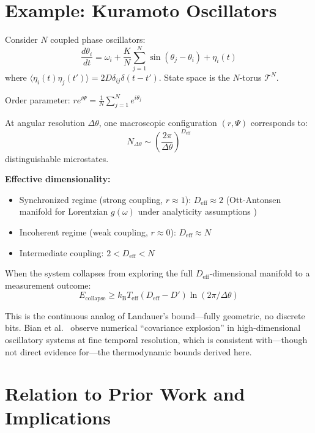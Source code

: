 \documentclass[12pt]{article}
\numberwithin{equation}{section}
\newcommand{\kB}{k_{\mathrm{B}}}
\newcommand{\Teff}{T_{\mathrm{eff}}}
\begin{document}
\section{Example: Kuramoto Oscillators}

Consider $N$ coupled phase oscillators:
\begin{equation}
\frac{d\theta_i}{dt} = \omega_i + \frac{K}{N}\sum_{j=1}^N \sin(\theta_j - \theta_i) + \eta_i(t)
\end{equation}
where $\langle\eta_i(t)\eta_j(t')\rangle = 2D\delta_{ij}\delta(t-t')$. State space is the $N$-torus $\mathcal{T}^N$.

Order parameter: $r e^{i\Psi} = \frac{1}{N}\sum_{j=1}^N e^{i\theta_j}$

At angular resolution $\Delta\theta$, one macroscopic configuration $(r, \Psi)$ corresponds to:
\begin{equation}
N_{\Delta\theta} \sim \left(\frac{2\pi}{\Delta\theta}\right)^{D_{\text{eff}}}
\end{equation}
distinguishable microstates.

\textbf{Effective dimensionality:}
\begin{itemize}
\item Synchronized regime (strong coupling, $r \approx 1$): $D_{\text{eff}} \approx 2$ (Ott-Antonsen manifold for Lorentzian $g(\omega)$ under analyticity assumptions \cite{ott2008,ott2009})
\item Incoherent regime (weak coupling, $r \approx 0$): $D_{\text{eff}} \approx N$
\item Intermediate coupling: $2 < D_{\text{eff}} < N$
\end{itemize}

When the system collapses from exploring the full $D_{\text{eff}}$-dimensional manifold to a measurement outcome:
\begin{equation}
E_{\text{collapse}} \geq \kB \Teff (D_{\text{eff}} - D') \ln(2\pi/\Delta\theta)
\end{equation}

This is the continuous analog of Landauer's bound---fully geometric, no discrete bits. Bian et al.\ \cite{bian2025ddga} observe numerical ``covariance explosion'' in high-dimensional oscillatory systems at fine temporal resolution, which is consistent with---though not direct evidence for---the thermodynamic bounds derived here.

\section{Relation to Prior Work and Implications}
\end{document}
